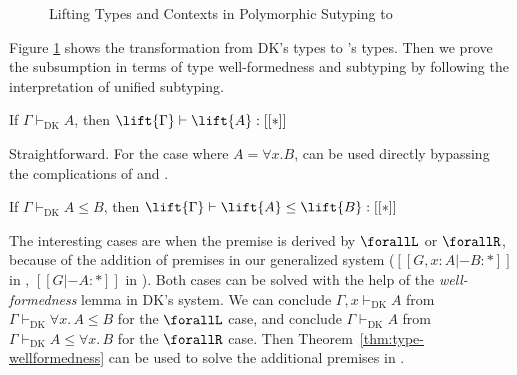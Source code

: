 \begin{figure}
    \caption{Lifting Types and Contexts in Polymorphic Sutyping to \name}
    \label{fig:lift}
\end{figure}
Figure \ref{fig:lift} shows the transformation from
DK's
types to \name's types.
Then we prove the subsumption in terms of type well-formedness and subtyping
by following the interpretation of unified subtyping.

\begin{theorem}
\label{thm:type-wellformedness}
    If $\Gamma \vdash_{\text{DK}} A$, then $\lift{\Gamma} \vdash \lift{A} : [[*]]$
\end{theorem}

Straightforward. For the case where $A = \forall x. B$,  can be
used directly bypassing the complications of  and
.

\begin{theorem}
    If $\Gamma \vdash_{\text{DK}} A \le B$, then $\lift{\Gamma} \vdash \lift{A} \le \lift{B} : [[*]]$
\end{theorem}

The interesting cases are when the premise is derived by $\forallL$ or $\forallR$,
because of the addition of premises in our generalized system
($[[G, x : A |- B : *]]$ in , $[[G |- A : *]]$ in ).
Both cases can be solved with the help of the \emph{well-formedness} lemma in
DK's system. We can conclude $\Gamma, x \vdash_{\text{DK}} A$ from
$\Gamma \vdash_{\text{DK}} \forall x.\, A \le B$ for the $\forallL$ case,
and conclude $\Gamma \vdash_{\text{DK}} A$ from $\Gamma \vdash_{\text{DK}} A \le \forall x.\, B$ for the $\forallR$ case.
Then Theorem~\ref{thm:type-wellformedness} can be used to solve the additional
premises in \name.

